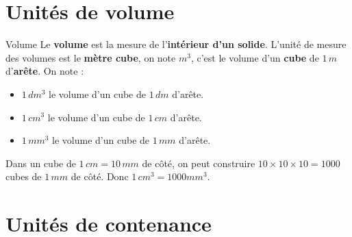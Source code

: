 \begin{pageCours} 

\section{Unités de volume}

\begin{DefT}{Volume}
Le \textbf{volume} est la mesure de l'\textbf{intérieur d'un solide}. L'unité de mesure des volumes est le \textbf{mètre cube}, on note $m^3$, c'est le volume d'un \textbf{cube} de $1\,m$ d'\textbf{arête}. On note :
\begin{itemize}
\item $1\,dm^3$ le volume d'un cube de $1\,dm$ d'arête.
\item $1\,cm^3$ le volume d'un cube de $1\,cm$ d'arête.
\item $1\,mm^3$ le volume d'un cube de $1\,mm$ d'arête.
\end{itemize}
\end{DefT}

\begin{Pp}
Dans un cube de $1\,cm=10\,mm$ de côté, on peut construire $10\times10\times10=1000$ cubes de $1\, mm$ de côté.
Donc $1 \,cm^3 = 1000 mm^3$.

\begin{center}

\end{center}
\end{Pp}

\section{Unités de contenance}


\end{pageCours}
